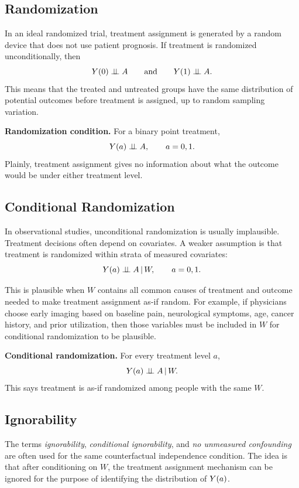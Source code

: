 \subsection{Randomization}

In an ideal randomized trial, treatment assignment is generated by a random device that does not use patient prognosis. If treatment is randomized unconditionally, then
\[
Y(0) \perp\!\!\!\perp A
\qquad\text{and}\qquad
Y(1) \perp\!\!\!\perp A.
\]
This means that the treated and untreated groups have the same distribution of potential outcomes before treatment is assigned, up to random sampling variation.

\begin{assumptionbox}
\textbf{Randomization condition.} For a binary point treatment,
\[
Y(a)\perp\!\!\!\perp A,\qquad a=0,1.
\]
Plainly, treatment assignment gives no information about what the outcome would be under either treatment level.
\end{assumptionbox}

\subsection{Conditional Randomization}

In observational studies, unconditional randomization is usually implausible. Treatment decisions often depend on covariates. A weaker assumption is that treatment is randomized within strata of measured covariates:
\[
Y(a)\perp\!\!\!\perp A\,\vert\, W,\qquad a=0,1.
\]

This is plausible when $W$ contains all common causes of treatment and outcome needed to make treatment assignment as-if random. For example, if physicians choose early imaging based on baseline pain, neurological symptoms, age, cancer history, and prior utilization, then those variables must be included in $W$ for conditional randomization to be plausible.

\begin{assumptionbox}
\textbf{Conditional randomization.} For every treatment level $a$,
\[
Y(a)\perp\!\!\!\perp A\,\vert\, W.
\]
This says treatment is as-if randomized among people with the same $W$.
\end{assumptionbox}

\subsection{Ignorability}

The terms \emph{ignorability}, \emph{conditional ignorability}, and \emph{no unmeasured confounding} are often used for the same counterfactual independence condition. The idea is that after conditioning on $W$, the treatment assignment mechanism can be ignored for the purpose of identifying the distribution of $Y(a)$.

